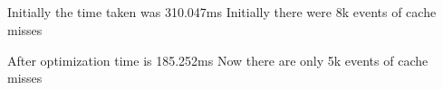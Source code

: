\documentclass{article}
\begin{document}
\subsection{}

\subsection{}

\subsection{}
Initially the time taken was 310.047ms
Initially there were 8k events of cache misses 

After optimization time is 185.252ms 
Now there are only 5k events of cache misses
\end{document}
